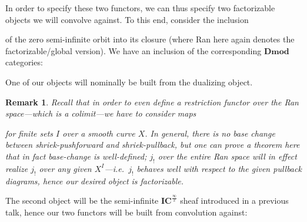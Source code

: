 \documentclass[12pt]{amsart}
\newtheorem{rmk}[thm]{Remark}
\newcommand\LT{\mathfrak{LT}}
\newcommand\LN{\mathfrak{LN}}
\newcommand\LNm{\mathfrak{L}(\mathfrak{N}^-)}
\newcommand\DMod{\mathbf{Dmod}}
\newcommand\IC{\mathbf{IC}}
\newcommand\Gr{\mathbf{Gr}}
\newcommand\semiinf{\frac{\infty}{2}}
\begin{document}
  In order to specify these two functors, we can thus specify two factorizable
  objects we will convolve against. To this end, consider the inclusion


  of the zero semi-infinite orbit into its closure (where Ran here again denotes
  the factorizable/global version). We
  have an inclusion of the corresponding $\DMod$ categories:


  One of our objects will nominally be built from the dualizing object.

  \begin{rmk}

  Recall that in order to even define a restriction functor
  over the Ran space---which is a colimit---we have
  to consider maps


  for finite sets $I$ over a smooth curve $X$. In general, there is no base
  change between shriek-pushforward and shriek-pullback, but one can prove a
  theorem here that in fact base-change is well-defined; $j_!$ over the entire
  Ran space will in effect realize $j_!$ over any given $X^I$---i.e.\ $j_!$
  behaves well with respect to the given pullback diagrams, hence our desired
  object is factorizable.
  \end{rmk}

  The second object will be the semi-infinite $\IC^{\semiinf}$ sheaf introduced
  in a previous talk, hence our two functors will be built from convolution
  against:

\end{document}
